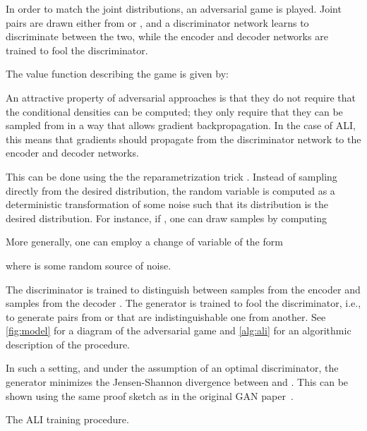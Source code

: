 \documentclass{article}
\begin{document}
In order to match the joint distributions, an adversarial game is played. Joint
pairs  are drawn either from  or
, and a discriminator network learns to discriminate between
the two, while the encoder and decoder networks are trained to fool the
discriminator.

The value function describing the game is given by:


An attractive property of adversarial approaches is that they do not require
that the conditional densities can be computed; they only require that they can
be sampled from in a way that allows gradient backpropagation. In the case of
ALI, this means that gradients should propagate from the discriminator network
to the encoder and decoder networks.

This can be done using the the reparametrization trick
\citep{kingma2013fast,bengio2013deep,bengio2013estimating}. Instead of sampling
directly from the desired distribution, the random variable is computed as a
deterministic transformation of some noise such that its distribution is the
desired distribution. For instance, if , one can draw samples by computing


More generally, one can employ a change of variable of the form

where  is some random source of noise.

The discriminator is trained to distinguish between samples from the encoder
 and samples from the decoder
. The generator is trained to
fool the discriminator, i.e., to generate  pairs from
 or  that are indistinguishable one from
another. See \autoref{fig:model} for a diagram of the adversarial game and
\autoref{alg:ali} for an algorithmic description of the procedure.

In such a setting, and under the assumption of an optimal discriminator, the
generator minimizes the Jensen-Shannon divergence \citep{lin1991divergence}
between  and . This can be shown using
the same proof sketch as in the original GAN
paper~\citep{goodfellow2014generative}.

\begin{algorithm}[t]
\begin{algorithmic}
    \State 
    \Repeat
		\State 
		\State 
		\State 
		\State 
        \State 
        \State 
        \State 
        \State 
        \State 
        \State 
\end{algorithmic}
\caption{\label{alg:ali} The ALI training procedure.}
\end{algorithm}
\end{document}
